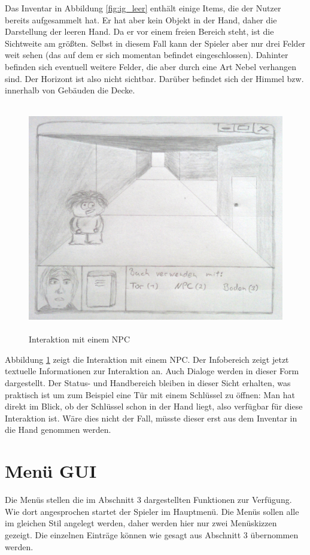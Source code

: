 Das Inventar in Abbildung \ref{fig:ig_leer} enthält einige Items, die der Nutzer bereits aufgesammelt hat.
Er hat aber kein Objekt in der Hand, daher die Darstellung der leeren Hand. Da er vor einem freien Bereich
steht, ist die Sichtweite am größten. Selbst in diesem Fall kann der Spieler aber nur drei Felder weit sehen
(das auf dem er sich momentan befindet eingeschlossen). Dahinter befinden sich eventuell weitere Felder, die
aber durch eine Art Nebel verhangen sind. Der Horizont ist also nicht sichtbar. Darüber befindet sich der
Himmel bzw. innerhalb von Gebäuden die Decke. 
\newpage
\begin{figure}[h]
	\begin{center}
		\includegraphics[width=13cm, height=10cm]{kapitel/ui/ig_npc_small.jpg}
	\end{center}
	\caption{Interaktion mit einem NPC}
	\label{fig:ig_npc}
\end{figure}
Abbildung \ref{fig:ig_npc} zeigt die Interaktion mit einem NPC. Der Infobereich zeigt jetzt textuelle
Informationen zur Interaktion an. Auch Dialoge werden in dieser Form dargestellt. Der Status- und Handbereich
bleiben in dieser Sicht erhalten, was praktisch ist um zum Beispiel eine Tür mit einem Schlüssel zu öffnen:
Man hat direkt im Blick, ob der Schlüssel schon in der Hand liegt, also verfügbar für diese Interaktion ist.
Wäre dies nicht der Fall, müsste dieser erst aus dem Inventar in die Hand genommen werden.
\newpage
\section{Menü GUI}
Die Menüs stellen die im Abschnitt 3 dargestellten Funktionen zur Verfügung. Wie dort angesprochen startet
der Spieler im Hauptmenü. Die Menüs sollen alle im gleichen Stil angelegt werden, daher werden hier nur zwei
Menüskizzen gezeigt. Die einzelnen Einträge können wie gesagt aus Abschnitt 3 übernommen werden.

